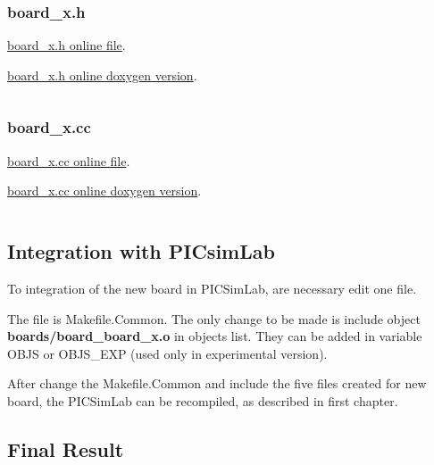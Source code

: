 \subsubsection{board\_x.h}

\href{https://github.com/lcgamboa/picsimlab/blob/master/src/boards/board_x.h}{ board\_x.h online file}.

\href{https://lcgamboa.github.io/picsimlab/devel/html/index.html#binc}{ board\_x.h online doxygen version}.


\inputminted[baselinestretch=1.2,fontsize=\footnotesize,linenos]{c++}{files/board_x.h}

\pagebreak
\subsubsection{board\_x.cc}

\href{https://github.com/lcgamboa/picsimlab/blob/master/src/boards/board_x.cc}{ board\_x.cc online file}.

\href{https://lcgamboa.github.io/picsimlab/devel/html/index.html#bcode}{ board\_x.cc online doxygen version}.

\inputminted[baselinestretch=1.2,fontsize=\footnotesize,linenos]{c++}{files/board_x.cc}


\subsection{Integration with PICsimLab}

To integration of the new board in PICSimLab, are necessary edit one file.

The file is Makefile.Common. The only change to be made is include object \textbf{boards/board\_board\_x.o} in 
 objects list. They can be added in variable OBJS or OBJS\_EXP (used only in experimental version).

After change the Makefile.Common and include the five files created for new board, the PICSimLab can be recompiled, as described in first chapter.


\subsection{Final Result}


